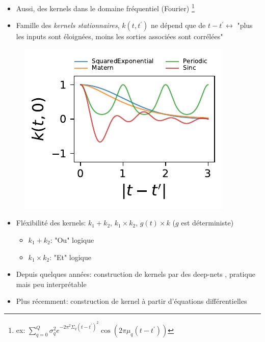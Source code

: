 \documentclass[xcolor=svgnames, t]{beamer}
\newcommand{\coloredemph}[1]{\textcolor{internationalblue}{\emph{#1}}}
\begin{document}
\begin{frame}{\subsecname}
  \begin{itemize}
    \item Aussi, des kernels dans le domaine fréquentiel (Fourier)\cite{Parra2017}%
    \footnote{ex: $\sum_{q=0}^Q \sigma_q^2 e^{-2 \pi^2 \Sigma_q (t-t^\prime)^2} \cos(2\pi \mu_q (t-t^\prime))$}
  \pause
    \item Famille des \coloredemph{kernels stationnaires}, 
    $k(t, t^\prime)$ ne dépend que de $t - t^\prime \leftrightarrow$ "plus les inputs sont éloignées, moins les sorties associées sont corrélées"
  \end{itemize}
  \begin{figure}
    \includegraphics[scale=0.80]{autocov_gp_1D.pdf}
  \end{figure}
\end{frame}

\begin{frame}{\subsecname}
  \begin{itemize}
    \item Fléxibilité des kernels: $k_1 + k_2$, $k_1 \times k_2$, $g(t) \times k$ ($g$ est déterministe)
  \pause
    \begin{itemize}
      \item $k_1 + k_2$: "Ou" logique
      \item $k_1 \times k_2$: "Et" logique
    \end{itemize}
    \item Depuis quelques années: construction de kernels par des deep-nets \cite{Wilson2016}, pratique mais peu interprétable%
  \pause
    \item Plus récemment: construction de kernel à  partir d'équations différentielles
  \end{itemize}
\end{frame}
\end{document}

